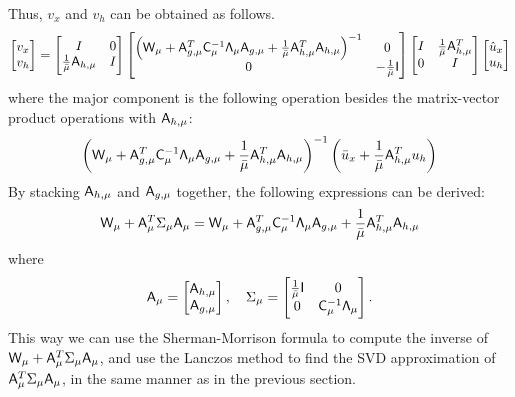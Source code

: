 Thus, $v_x$ and $v_h$ can be obtained as follows.
\begin{equation}\label{eq:core_equ}
\begin{bmatrix} v_x \\ v_h  \end{bmatrix} 
=
\begin{bmatrix}
I & 0 \\
\frac{1}{\bar{\mu}} \mathsf{A}_{h,\mu}  &  I 
\end{bmatrix}
\begin{bmatrix}
\left(\mathsf{W}_\mu +  \mathsf{A}_{g,\mu}^T  \mathsf{C}_\mu^{-1} \mathsf{\Lambda}_\mu  \mathsf{A}_{g,\mu}  
+ \frac{1}{\bar{\mu}}  \mathsf{A}_{h,\mu}^T \mathsf{A}_{h,\mu} \right)^{-1}    & 0 \\
0  &  -\frac{1}{\bar{\mu}}\mathsf{I} 
\end{bmatrix}
\begin{bmatrix}
I  & \frac{1}{\bar{\mu}} \mathsf{A}_{h,\mu}^T  \\
0  &  I
\end{bmatrix}
\begin{bmatrix}
\hat{u}_{x} \\ u_h
\end{bmatrix}
\end{equation}
where the major component is the following operation besides the matrix-vector product operations with $\mathsf{A}_{h,\mu}$: 
\begin{equation}
\left(\mathsf{W}_\mu +  \mathsf{A}_{g,\mu}^T  \mathsf{C}_\mu^{-1} \mathsf{\Lambda}_\mu  \mathsf{A}_{g,\mu}  
+ \frac{1}{\bar{\mu}}  \mathsf{A}_{h,\mu}^T \mathsf{A}_{h,\mu} \right)^{-1}  \left(\bar{u}_x + \frac{1}{\bar{\mu}} \mathsf{A}_{h,\mu}^T u_{h}  \right)
\end{equation}
By stacking $ \mathsf{A}_{h,\mu} $ and $\mathsf{A}_{g,\mu}$ together, 
the following expressions can be derived: 
\begin{equation}
\mathsf{W}_\mu  +  \mathsf{A}_\mu ^T \Sigma_{\mu} \mathsf{A}_\mu = 
\mathsf{W}_\mu +  \mathsf{A}_{g,\mu}^T  \mathsf{C}_\mu^{-1} \mathsf{\Lambda}_\mu  \mathsf{A}_{g,\mu}  
+ \frac{1}{\bar{\mu}}  \mathsf{A}_{h,\mu}^T \mathsf{A}_{h,\mu} 
\end{equation}
where 
\begin{equation}
 \mathsf{A}_\mu = 
 \begin{bmatrix}
 \mathsf{A}_{h,\mu} \\
 \mathsf{A}_{g,\mu}
 \end{bmatrix},   \quad 
  \Sigma_{\mu} = 
  \begin{bmatrix}  
  \frac{1}{\bar{\mu}} \mathsf{I}  & 0 \\
  0   &  \mathsf{C}_\mu^{-1} \mathsf{\Lambda}_\mu 
  \end{bmatrix}.
\end{equation}
This way we can use the Sherman-Morrison formula to compute the inverse of 
$\mathsf{W}_\mu  +  \mathsf{A}_\mu ^T \Sigma_{\mu} \mathsf{A}_\mu$, and use the Lanczos method to find the SVD 
approximation of $\mathsf{A}_\mu ^T \Sigma_{\mu} \mathsf{A}_\mu$, in the same manner as in the previous section. 

